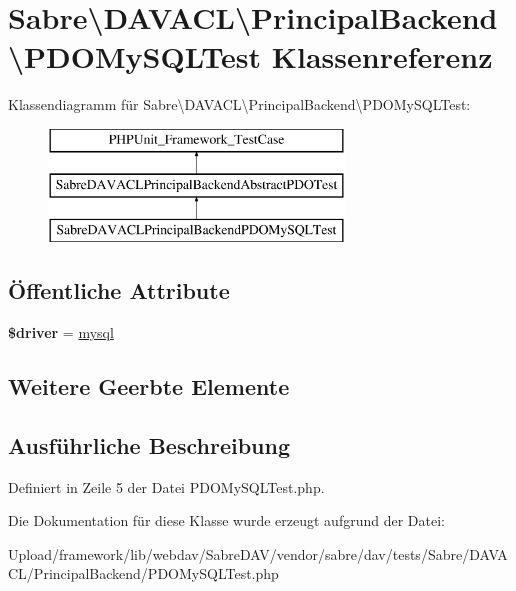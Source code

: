 \hypertarget{class_sabre_1_1_d_a_v_a_c_l_1_1_principal_backend_1_1_p_d_o_my_s_q_l_test}{}\section{Sabre\textbackslash{}D\+A\+V\+A\+CL\textbackslash{}Principal\+Backend\textbackslash{}P\+D\+O\+My\+S\+Q\+L\+Test Klassenreferenz}
\label{class_sabre_1_1_d_a_v_a_c_l_1_1_principal_backend_1_1_p_d_o_my_s_q_l_test}
Klassendiagramm für Sabre\textbackslash{}D\+A\+V\+A\+CL\textbackslash{}Principal\+Backend\textbackslash{}P\+D\+O\+My\+S\+Q\+L\+Test\+:\begin{figure}[H]
\begin{center}
\leavevmode
\includegraphics[height=3.000000cm]{class_sabre_1_1_d_a_v_a_c_l_1_1_principal_backend_1_1_p_d_o_my_s_q_l_test}
\end{center}
\end{figure}
\subsection*{Öffentliche Attribute}
\begin{DoxyCompactItemize}
\item 
\mbox{\label{class_sabre_1_1_d_a_v_a_c_l_1_1_principal_backend_1_1_p_d_o_my_s_q_l_test_a3a6c8bd0407549dc7823df5e6dea5553}} 
{\bfseries \$driver} = \textquotesingle{}\mbox{\hyperlink{classmysql}{mysql}}\textquotesingle{}
\end{DoxyCompactItemize}
\subsection*{Weitere Geerbte Elemente}


\subsection{Ausführliche Beschreibung}


Definiert in Zeile 5 der Datei P\+D\+O\+My\+S\+Q\+L\+Test.\+php.



Die Dokumentation für diese Klasse wurde erzeugt aufgrund der Datei\+:\begin{DoxyCompactItemize}
\item 
Upload/framework/lib/webdav/\+Sabre\+D\+A\+V/vendor/sabre/dav/tests/\+Sabre/\+D\+A\+V\+A\+C\+L/\+Principal\+Backend/P\+D\+O\+My\+S\+Q\+L\+Test.\+php\end{DoxyCompactItemize}
